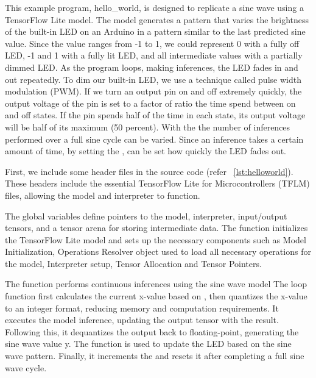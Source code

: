 This example program, hello\_world, is designed to replicate a sine wave using a TensorFlow Lite model. The model generates a pattern that varies the brightness of the built-in LED on an Arduino in a pattern similar to the last predicted sine value. Since the value ranges from -1 to 1, we could represent 0 with a fully off LED, -1 and 1 with a fully lit LED, and all intermediate values with a partially dimmed LED. As the program loops, making inferences, the LED fades in and out repeatedly. To dim our built-in LED, we use a technique called pulse width modulation (PWM). If we turn an output pin on and off extremely quickly, the output voltage of the pin is set to a factor of ratio the time spend between on and off states. If the pin spends half of the time in each state, its output voltage will be half of its maximum (50 percent). 
With the  the number of inferences performed over a full sine cycle can be varied. Since an inference takes a certain amount of time, by setting the , can be set how quickly the LED fades out. \cite{tensorflowblog:2024}

First, we include some header files in the source code (refer ~\ref{lst:helloworld}). These headers include the essential TensorFlow Lite for Microcontrollers (TFLM) files, allowing the model and interpreter to function.

The global variables define pointers to the model, interpreter, input/output tensors, and a tensor arena for storing intermediate data.
The  function initializes the TensorFlow Lite model and sets up the necessary components such as Model Initialization, Operations Resolver  object used to load all necessary operations for the model, Interpreter setup, Tensor Allocation and Tensor Pointers.

The  function performs continuous inferences using the sine wave model
The loop function first calculates the current x-value based on , then quantizes the x-value to an integer format, reducing memory and computation requirements. It executes the model inference, updating the output tensor with the result. Following this, it dequantizes the output back to floating-point, generating the sine wave value y. The  function is used to update the LED based on the sine wave pattern. Finally, it increments the  and resets it after completing a full sine wave cycle.


